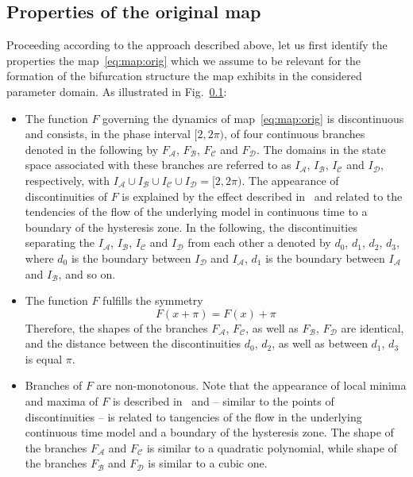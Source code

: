 \documentclass[10pt]{article}
\newcommand{\A}{{\mathcal A}}
\newcommand{\B}{{\mathcal B}}
\newcommand{\C}{{\mathcal C}}
\newcommand{\D}{{\mathcal D}}
\newcommand{\FA}{F_\A}
\newcommand{\FB}{F_\B}
\newcommand{\FC}{F_\C}
\newcommand{\FD}{F_\D}
\begin{document}
\subsection{Properties of the original map}

Proceeding according to the approach described above, let us first
identify the properties the map~\eqref{eq:map:orig}
which we assume to be relevant for the formation of the bifurcation
structure the map
exhibits in the
considered parameter domain. As illustrated in Fig.~\ref{}:
\begin{itemize}
	\item The function $F$ governing the dynamics of
	      map~\eqref{eq:map:orig} is discontinuous and consists, in the phase
	      interval $[2, 2\pi)$, of four continuous branches denoted in the
	      following by $\FA$, $\FB$, $\FC$ and $\FD$.
	      The domains in the state space associated with these branches
	      are referred to as $I_\A$, $I_\B$, $I_\C$ and $I_\D$, respectively,
	      with  $I_\A \cup I_\B \cup I_\C \cup I_\D = [2, 2\pi)$.
	      The appearance of
	      discontinuities of $F$ is explained by the effect described
	      in~\cite{} and related to the tendencies of the flow of the underlying
	      model in continuous time to a boundary of the hysteresis zone.  In
	      the following, the discontinuities separating the
	      $I_\A$, $I_\B$, $I_\C$ and $I_\D$ from each other
	      a denoted by $d_0$, $d_1$, $d_2$, $d_3$, where $d_0$ is the boundary
	      between $I_\D$ and $I_\A$,  $d_1$ is the boundary
	      between $I_\A$ and $I_\B$, and so on.
	\item
	      The function $F$ fulfills the symmetry
	      \begin{equation}
		      \label{eq:symmetry}
		      F(x+\pi)=F(x)+\pi
	      \end{equation}
	      Therefore, the shapes of the branches $\FA$, $\FC$,
	      as well as  $\FB$, $\FD$ are identical, and the distance
	      between the discontinuities $d_0$, $d_2$, as well as between
	      $d_1$, $d_3$ is equal $\pi$.
	\item
	      Branches of $F$ are non-monotonous.  Note that the appearance of
	      local minima and maxima of $F$ is described in~\cite{} and --
	      similar to the points of discontinuities -- is related to
	      tangencies of the flow in the underlying continuous time model and
	      a boundary of the hysteresis zone.  The shape of the branches
	      $\FA$ and $\FC$ is similar to a quadratic polynomial, while
	      shape of the branches $\FB$ and $\FD$ is similar to a cubic one.
\end{itemize}
\end{document}
